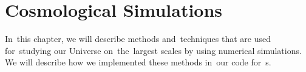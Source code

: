 \chapter{Cosmological Simulations}
\label{chpt:cosmo_sim}
In~this chapter, we will describe methods and~techniques that are used for~studying our Universe on~the~largest scales by using numerical simulations. We will describe how we implemented these methods in~our code for~\nbodysim s.





